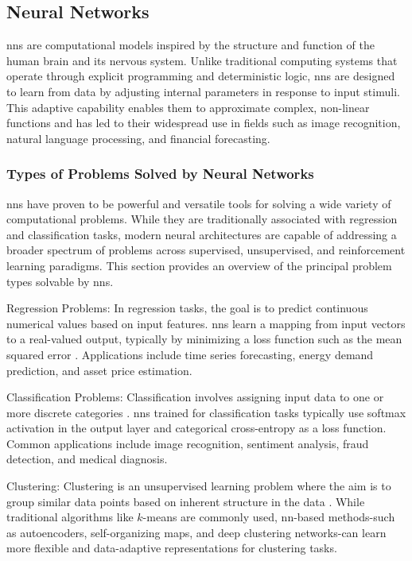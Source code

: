 \subsection{Neural Networks}
\ac{nn}s are computational models inspired by the structure and function of the human brain and its nervous system. Unlike traditional computing systems that operate through explicit programming and deterministic logic, \ac{nn}s are designed to learn from data by adjusting internal parameters in response to input stimuli. This adaptive capability enables them to approximate complex, non-linear functions and has led to their widespread use in fields such as image recognition, natural language processing, and financial forecasting.

\subsubsection{Types of Problems Solved by Neural Networks}
\ac{nn}s have proven to be powerful and versatile tools for solving a wide variety of computational problems. While they are traditionally associated with regression and classification tasks, modern neural architectures are capable of addressing a broader spectrum of problems across supervised, unsupervised, and reinforcement learning paradigms. This section provides an overview of the principal problem types solvable by \ac{nn}s.

Regression Problems: In regression tasks, the goal is to predict continuous numerical values based on input features. \ac{nn}s learn a mapping from input vectors to a real-valued output, typically by minimizing a loss function such as the mean squared error \parencite[p.~99]{goodfellow2016deeplearning}. Applications include time series forecasting, energy demand prediction, and asset price estimation.

Classification Problems: Classification involves assigning input data to one or more discrete categories \parencite[p.~98]{goodfellow2016deeplearning}. \ac{nn}s trained for classification tasks typically use softmax activation in the output layer and categorical cross-entropy as a loss function. Common applications include image recognition, sentiment analysis, fraud detection, and medical diagnosis.

Clustering: Clustering is an unsupervised learning problem where the aim is to group similar data points based on inherent structure in the data \parencite{aljalbout2018clustering}. While traditional algorithms like $k$-means are commonly used, \ac{nn}-based methods-such as autoencoders, self-organizing maps, and deep clustering networks-can learn more flexible and data-adaptive representations for clustering tasks.

